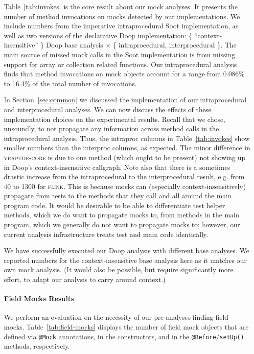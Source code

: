 Table~\ref{tab:invokes} is the core result about our mock analyses. It presents the number of method invocations on mocks detected by our implementations. We include numbers from the imperative intraprocedural Soot implementation, as well as two versions of the declarative Doop implementation: \{ ``context-insensitive'' \} Doop base analysis $\times$ \{ intraprocedural, interprocedural \}. The main source of missed mock calls in the Soot implementation is from missing support for array or collection related functions. Our intraprocedural analysis finds that method invocations on mock objects account for a range from 0.086\% to 16.4\% of the total number of invocations. 


In Section~\ref{sec:common} we discussed the implementation of our intraprocedural and interprocedural analyses. We can now discuss the effects of these implementation choices on the experimental results. Recall that we chose, unsoundly, to not propagate any information across method calls in the intraprocedural analysis. Thus, the intraproc columns in Table~\ref{tab:invokes} show smaller numbers than the interproc columns, as expected. The minor difference in \textsc{vraptor-core} is due to one method (which ought to be present) not showing up in Doop's context-insensitive callgraph. Note also that there is a sometimes drastic increase from the intraprocedural to the interprocedural result, e.g. from 40 to 1300 for \textsc{flink}. This is because mocks can (especially context-insensitively) propagate from tests to the methods that they call and all around the main program code. It would be desirable to be able to differentiate test helper methods, which we do want to propagate mocks to, from methods in the main program, which we generally do not want to propagate mocks to; however, our current analysis infrastructure treats test and main code identically.

We have successfully executed our Doop analysis with different base analyses. We reported numbers for the context-insensitive base analysis here as it matches our own mock analysis. (It would also be possible, but require significantly more effort, to adapt our analysis to carry around context.)

\paragraph{Field Mocks Results} We perform an evaluation on the necessity of our pre-analyses finding field mocks. 
Table~\ref{tab:field-mocks} displays the number of field mock objects that are defined via \texttt{@Mock} annotations, in the constructors, and in the \texttt{@Before}/\texttt{setUp()} methods, respectively. 

